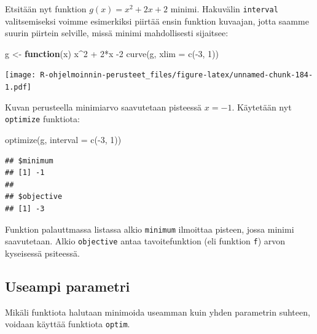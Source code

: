 \documentclass[
]{book}
\newenvironment{Shaded}{\begin{snugshade}}{\end{snugshade}}
\newcommand{\AttributeTok}[1]{\textcolor[rgb]{0.77,0.63,0.00}{#1}}
\newcommand{\ControlFlowTok}[1]{\textcolor[rgb]{0.13,0.29,0.53}{\textbf{#1}}}
\newcommand{\DecValTok}[1]{\textcolor[rgb]{0.00,0.00,0.81}{#1}}
\newcommand{\FunctionTok}[1]{\textcolor[rgb]{0.00,0.00,0.00}{#1}}
\newcommand{\NormalTok}[1]{#1}
\newcommand{\OtherTok}[1]{\textcolor[rgb]{0.56,0.35,0.01}{#1}}
\newcommand{\SpecialCharTok}[1]{\textcolor[rgb]{0.00,0.00,0.00}{#1}}
\begin{document}
Etsitään nyt funktion \(g(x) = x^2 + 2x + 2\) minimi. Hakuvälin \texttt{interval} valitsemiseksi voimme esimerkiksi piirtää ensin funktion kuvaajan, jotta saamme suurin piirtein selville, missä minimi mahdollisesti sijaitsee:

\begin{Shaded}
\begin{Highlighting}[]
\NormalTok{g }\OtherTok{\textless{}{-}} \ControlFlowTok{function}\NormalTok{(x) x}\SpecialCharTok{\^{}}\DecValTok{2} \SpecialCharTok{+} \DecValTok{2}\SpecialCharTok{*}\NormalTok{x }\SpecialCharTok{{-}}\DecValTok{2}
\FunctionTok{curve}\NormalTok{(g, }\AttributeTok{xlim =} \FunctionTok{c}\NormalTok{(}\SpecialCharTok{{-}}\DecValTok{3}\NormalTok{, }\DecValTok{1}\NormalTok{))}
\end{Highlighting}
\end{Shaded}

\texttt{[image: R-ohjelmoinnin-perusteet\_files/figure-latex/unnamed-chunk-184-1.pdf]}

Kuvan perusteella minimiarvo saavutetaan pisteessä \(x = -1\). Käytetään nyt \texttt{optimize} funktiota:

\begin{Shaded}
\begin{Highlighting}[]
\FunctionTok{optimize}\NormalTok{(g, }\AttributeTok{interval =} \FunctionTok{c}\NormalTok{(}\SpecialCharTok{{-}}\DecValTok{3}\NormalTok{, }\DecValTok{1}\NormalTok{))}
\end{Highlighting}
\end{Shaded}

\begin{verbatim}
## $minimum
## [1] -1
## 
## $objective
## [1] -3
\end{verbatim}

Funktion palauttmassa listassa alkio \texttt{minimum} ilmoittaa pisteen, jossa minimi saavutetaan. Alkio \texttt{objective} antaa tavoitefunktion (eli funktion \texttt{f}) arvon kyseisessä psiteessä.

\hypertarget{useampi-parametri}{%
\subsection{Useampi parametri}\label{useampi-parametri}}

Mikäli funktiota halutaan minimoida useamman kuin yhden parametrin suhteen, voidaan käyttää funktiota \texttt{optim}.
\end{document}
